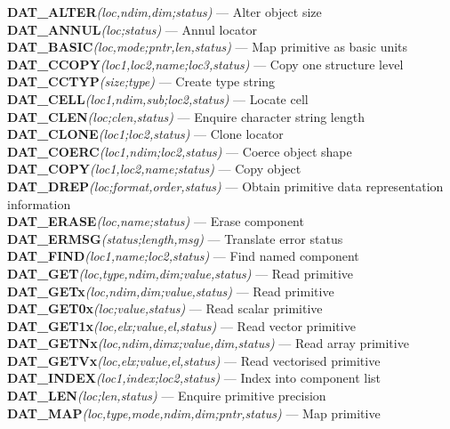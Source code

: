 {\bf DAT\_ALTER}{\em (loc,ndim,dim;status)} --- Alter object size \\
{\bf DAT\_ANNUL}{\em (loc;status)} --- Annul locator \\
{\bf DAT\_BASIC}{\em (loc,mode;pntr,len,status)} --- Map primitive as basic units \\
{\bf DAT\_CCOPY}{\em (loc1,loc2,name;loc3,status)} --- Copy one structure level\\
{\bf DAT\_CCTYP}{\em (size;type)} --- Create type string\\
{\bf DAT\_CELL}{\em (loc1,ndim,sub;loc2,status)} --- Locate cell \\
{\bf DAT\_CLEN}{\em (loc;clen,status)} --- Enquire character string length \\
{\bf DAT\_CLONE}{\em (loc1;loc2,status)} --- Clone locator \\
{\bf DAT\_COERC}{\em (loc1,ndim;loc2,status)} --- Coerce object shape \\
{\bf DAT\_COPY}{\em (loc1,loc2,name;status)} --- Copy object \\
{\bf DAT\_DREP}{\em (loc;format,order,status)} --- Obtain primitive data representation information\\
{\bf DAT\_ERASE}{\em (loc,name;status)} --- Erase component \\
{\bf DAT\_ERMSG}{\em (status;length,msg)} --- Translate error status\\
{\bf DAT\_FIND}{\em (loc1,name;loc2,status)} --- Find named component \\
{\bf DAT\_GET}{\em (loc,type,ndim,dim;value,status)} --- Read primitive \\
{\bf DAT\_GETx}{\em (loc,ndim,dim;value,status)} --- Read primitive \\
{\bf DAT\_GET0x}{\em (loc;value,status)} --- Read scalar primitive\\
{\bf DAT\_GET1x}{\em (loc,elx;value,el,status)} --- Read vector primitive\\
{\bf DAT\_GETNx}{\em (loc,ndim,dimx;value,dim,status)} --- Read array primitive\\
{\bf DAT\_GETVx}{\em (loc,elx;value,el,status)} --- Read vectorised primitive\\
{\bf DAT\_INDEX}{\em (loc1,index;loc2,status)} --- Index into component list \\
{\bf DAT\_LEN}{\em (loc;len,status)} --- Enquire primitive precision \\
{\bf DAT\_MAP}{\em (loc,type,mode,ndim,dim;pntr,status)} --- Map primitive \\
